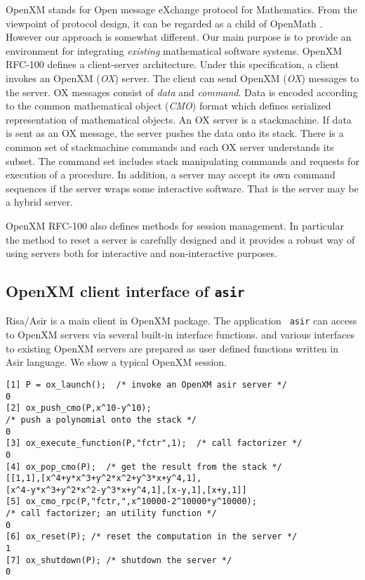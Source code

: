 \documentclass[runningheads]{cl2emult}
\begin{document}
OpenXM stands for Open message eXchange protocol for Mathematics.
From the viewpoint of protocol design, it can be regarded as a child
of OpenMath \cite{OPENMATH}.  However our approach is somewhat
different. Our main purpose is to provide an environment for
integrating {\it existing} mathematical software systems. OpenXM
RFC-100 \cite{RFC100} defines a client-server architecture.  Under
this specification, a client invokes an OpenXM ({\it OX}) server.  The
client can send OpenXM ({\it OX}) messages to the server.  OX messages
consist of {\it data} and {\it command}. Data is encoded according to
the common mathematical object ({\it CMO}) format which defines
serialized representation of mathematical objects.  An OX server is a
stackmachine. If data is sent as an OX message, the server pushes the
data onto its stack. There is a common set of stackmachine commands
and each OX server understands its subset. The command set includes
stack manipulating commands and requests for execution of a procedure. 
In addition, a server may accept its own command sequences if the
server wraps some interactive software. That is the server may be a
hybrid server.

OpenXM RFC-100 also defines methods for session management. In particular
the method to reset a server is carefully designed and it provides
a robust way of using servers both for interactive and non-interactive
purposes.

\subsection{OpenXM client interface of {\tt asir}}

Risa/Asir is a main client in OpenXM package.  The application {\tt
asir} can access to OpenXM servers via several built-in interface
functions. and various interfaces to existing OpenXM servers are
prepared as user defined functions written in Asir language. 
We show a typical OpenXM session.

\begin{verbatim}
[1] P = ox_launch();  /* invoke an OpenXM asir server */
0
[2] ox_push_cmo(P,x^10-y^10);
/* push a polynomial onto the stack */
0
[3] ox_execute_function(P,"fctr",1);  /* call factorizer */
0
[4] ox_pop_cmo(P);  /* get the result from the stack */
[[1,1],[x^4+y*x^3+y^2*x^2+y^3*x+y^4,1],
[x^4-y*x^3+y^2*x^2-y^3*x+y^4,1],[x-y,1],[x+y,1]]
[5] ox_cmo_rpc(P,"fctr,",x^10000-2^10000*y^10000); 
/* call factorizer; an utility function */
0
[6] ox_reset(P); /* reset the computation in the server */
1
[7] ox_shutdown(P); /* shutdown the server */
0
\end{verbatim}
\end{document}

